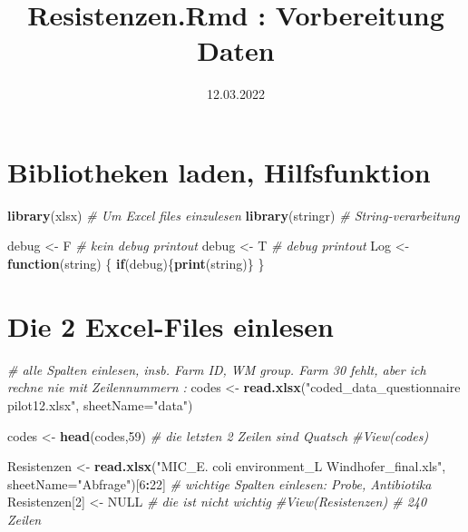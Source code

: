 \documentclass[
]{article}
\title{Resistenzen.Rmd : Vorbereitung Daten}
\author{}
\date{\vspace{-2.5em}12.03.2022}
\newenvironment{Shaded}{\begin{snugshade}}{\end{snugshade}}
\newcommand{\CommentTok}[1]{\textcolor[rgb]{0.56,0.35,0.01}{\textit{#1}}}
\newcommand{\ControlFlowTok}[1]{\textcolor[rgb]{0.13,0.29,0.53}{\textbf{#1}}}
\newcommand{\DataTypeTok}[1]{\textcolor[rgb]{0.13,0.29,0.53}{#1}}
\newcommand{\DecValTok}[1]{\textcolor[rgb]{0.00,0.00,0.81}{#1}}
\newcommand{\KeywordTok}[1]{\textcolor[rgb]{0.13,0.29,0.53}{\textbf{#1}}}
\newcommand{\NormalTok}[1]{#1}
\newcommand{\OperatorTok}[1]{\textcolor[rgb]{0.81,0.36,0.00}{\textbf{#1}}}
\newcommand{\OtherTok}[1]{\textcolor[rgb]{0.56,0.35,0.01}{#1}}
\newcommand{\StringTok}[1]{\textcolor[rgb]{0.31,0.60,0.02}{#1}}
\begin{document}
\maketitle

\hypertarget{bibliotheken-laden-hilfsfunktion}{%
\section{Bibliotheken laden,
Hilfsfunktion}\label{bibliotheken-laden-hilfsfunktion}}

\begin{Shaded}
\begin{Highlighting}[]
\KeywordTok{library}\NormalTok{(xlsx)                 }\CommentTok{# Um Excel files einzulesen}
\KeywordTok{library}\NormalTok{(stringr)              }\CommentTok{# String-verarbeitung}

\NormalTok{debug <-}\StringTok{ }\NormalTok{F                    }\CommentTok{# kein debug printout}
\NormalTok{debug <-}\StringTok{ }\NormalTok{T                    }\CommentTok{# debug printout}
\NormalTok{Log <-}\StringTok{ }\ControlFlowTok{function}\NormalTok{(string) \{}
  \ControlFlowTok{if}\NormalTok{(debug)\{}\KeywordTok{print}\NormalTok{(string)\}  }
\NormalTok{\}}
\end{Highlighting}
\end{Shaded}

\hypertarget{die-2-excel-files-einlesen}{%
\section{Die 2 Excel-Files einlesen}\label{die-2-excel-files-einlesen}}

\begin{Shaded}
\begin{Highlighting}[]
\CommentTok{# alle Spalten einlesen, insb.  Farm ID,    WM group. Farm 30 fehlt, aber ich rechne nie mit Zeilennummern :}
\NormalTok{codes <-}\StringTok{ }\KeywordTok{read.xlsx}\NormalTok{(}\StringTok{"coded_data_questionnaire pilot12.xlsx"}\NormalTok{, }\DataTypeTok{sheetName=}\StringTok{"data"}\NormalTok{)}

\NormalTok{codes <-}\StringTok{ }\KeywordTok{head}\NormalTok{(codes,}\DecValTok{59}\NormalTok{)  }\CommentTok{# die letzten 2 Zeilen sind Quatsch}
\CommentTok{#View(codes)}
\end{Highlighting}
\end{Shaded}

\begin{Shaded}
\begin{Highlighting}[]
\NormalTok{Resistenzen <-}\StringTok{ }\KeywordTok{read.xlsx}\NormalTok{(}\StringTok{"MIC_E. coli environment_L Windhofer_final.xls"}\NormalTok{, }\DataTypeTok{sheetName=}\StringTok{"Abfrage"}\NormalTok{)[}\DecValTok{6}\OperatorTok{:}\DecValTok{22}\NormalTok{]   }\CommentTok{# wichtige Spalten einlesen: Probe, Antibiotika}
\NormalTok{Resistenzen[}\DecValTok{2}\NormalTok{] <-}\StringTok{ }\OtherTok{NULL}        \CommentTok{# die ist nicht wichtig}
\CommentTok{#View(Resistenzen)            # 240 Zeilen}
\end{Highlighting}
\end{Shaded}
\end{document}
